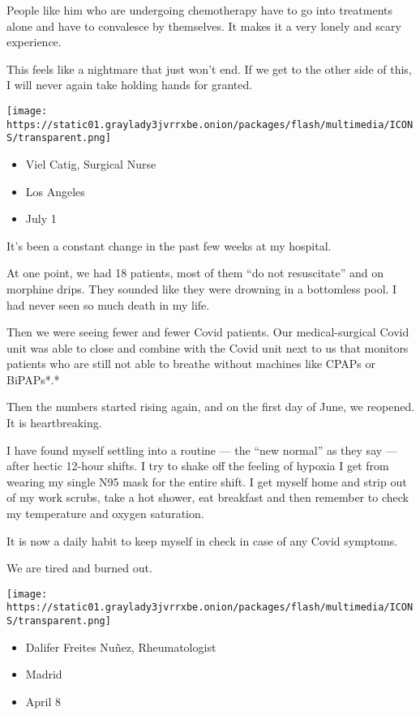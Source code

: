 People like him who are undergoing chemotherapy have to go into
treatments alone and have to convalesce by themselves. It makes it a
very lonely and scary experience.

This feels like a nightmare that just won't end. If we get to the other
side of this, I will never again take holding hands for granted.

\texttt{[image: https://static01.graylady3jvrrxbe.onion/packages/flash/multimedia/ICONS/transparent.png]}

\begin{itemize}
\tightlist
\item
  Viel Catig, Surgical Nurse
\item
  Los Angeles
\item
  July 1
\end{itemize}

It's been a constant change in the past few weeks at my hospital.

At one point, we had 18 patients, most of them ``do not resuscitate''
and on morphine drips. They sounded like they were drowning in a
bottomless pool. I had never seen so much death in my life.

Then we were seeing fewer and fewer Covid patients. Our medical-surgical
Covid unit was able to close and combine with the Covid unit next to us
that monitors patients who are still not able to breathe without
machines like CPAPs or BiPAPs*.*

Then the numbers started rising again, and on the first day of June, we
reopened. It is heartbreaking.

I have found myself settling into a routine --- the ``new normal'' as
they say --- after hectic 12-hour shifts. I try to shake off the feeling
of hypoxia I get from wearing my single N95 mask for the entire shift. I
get myself home and strip out of my work scrubs, take a hot shower, eat
breakfast and then remember to check my temperature and oxygen
saturation.

It is now a daily habit to keep myself in check in case of any Covid
symptoms.

We are tired and burned out.

\texttt{[image: https://static01.graylady3jvrrxbe.onion/packages/flash/multimedia/ICONS/transparent.png]}

\begin{itemize}
\tightlist
\item
  Dalifer Freites Nuñez, Rheumatologist
\item
  Madrid
\item
  April 8
\end{itemize}

